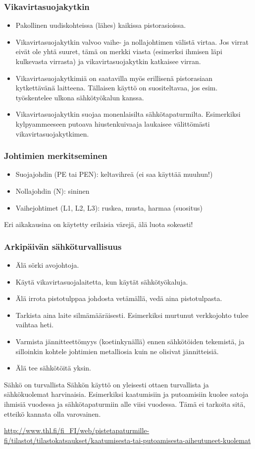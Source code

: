 \begin{frame}
\frametitle{Vikavirtasuojakytkin}
\begin{itemize}
\item Pakollinen uudiskohteissa (lähes) kaikissa pistorasioissa.
\item Vikavirtasuojakytkin valvoo vaihe- ja nollajohtimen välistä virtaa. Jos virrat eivät ole yhtä suuret, tämä on merkki viasta (esimerksi ihmisen läpi kulkevasta virrasta) ja vikavirtasuojakytkin katkaisee virran.
\item Vikavirtasuojakytkimiä on saatavilla myös erillisenä pistorasiaan kytkettävänä laitteena. Tällaisen käyttö on suositeltavaa, jos esim. työskentelee ulkona sähkötyökalun kanssa.
\item Vikavirtasuojakytkin suojaa monenlaisilta sähkötapaturmilta. Esimerkiksi kylpyammeeseen putoava hiustenkuivaaja laukaisee välittömästi vikavirtasuojakytkimen.
\end{itemize}
\end{frame}

\begin{frame}
\frametitle{Johtimien merkitseminen}
\begin{itemize}
\item Suojajohdin (PE tai PEN): keltavihreä (ei saa käyttää muuhun!)
\item Nollajohdin (N): sininen
\item Vaihejohtimet (L1, L2, L3): ruskea, musta, harmaa (suositus)
\end{itemize}
Eri aikakausina on käytetty erilaisia värejä, älä luota sokeasti! 

\end{frame}

\begin{frame}
\frametitle{Arkipäivän sähköturvallisuus}
\begin{itemize}
\item Älä sörki avojohtoja.
\item Käytä vikavirtasuojalaitetta, kun käytät sähkötyökaluja.
\item Älä irrota pistotulppaa johdosta vetämällä, vedä aina pistotulpasta.
\item Tarkista aina laite silmämääräisesti. Esimerkiksi murtunut verkkojohto tulee vaihtaa heti. 
\item Varmista jännitteettömyys (koetinkynällä) ennen sähkötöiden tekemistä, ja silloinkin kohtele johtimien metalliosia kuin ne olisivat jännitteisiä.
\item Älä tee sähkötöitä yksin.
\end{itemize}
\begin{block}{Sähkö on turvallista}
Sähkön käyttö on yleisesti ottaen turvallista ja sähkökuolemat harvinaisia. Esimerkiksi kaatumisiin ja putoamisiin kuolee satoja ihmisiä vuodessa ja sähkötapaturmiin alle viisi vuodessa. Tämä ei tarkoita sitä, etteikö kannata olla varovainen.
\end{block}
\tiny \url{http://www.thl.fi/fi_FI/web/pistetapaturmille-fi/tilastot/tilastokatsaukset/kaatumisesta-tai-putoamisesta-aiheutuneet-kuolemat}
\end{frame}

